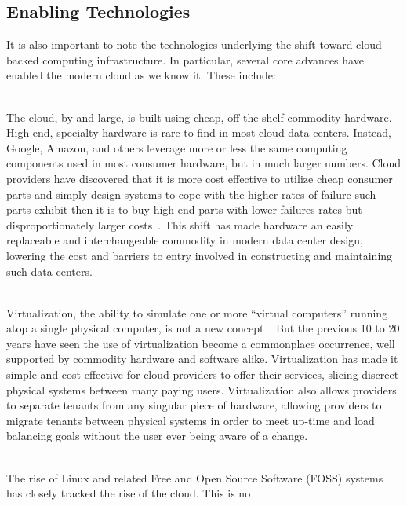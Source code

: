 \subsection{Enabling Technologies}

It is also important to note the technologies underlying the shift
toward cloud-backed computing infrastructure. In particular, several
core advances have enabled the modern cloud as we know it. These
include:

\begin{packed_desc}
\item[Commoditization of Hardware] \hfill \\ The cloud, by and large,
  is built using cheap, off-the-shelf commodity hardware. High-end,
  specialty hardware is rare to find in most cloud data
  centers. Instead, Google, Amazon, and others leverage more or less
  the same computing components used in most consumer hardware, but in
  much larger numbers. Cloud providers have discovered that it is more
  cost effective to utilize cheap consumer parts and simply design
  systems to cope with the higher rates of failure such parts exhibit
  then it is to buy high-end parts with lower failures rates but
  disproportionately larger costs~\cite{atwood2007}. This shift has
  made hardware an easily replaceable and interchangeable commodity in
  modern data center design, lowering the cost and barriers to entry
  involved in constructing and maintaining such data centers.
\item[Virtualization] \hfill \\ Virtualization, the ability to
  simulate one or more ``virtual computers'' running atop a single
  physical computer, is not a new concept~\cite{goldberg1974}. But the
  previous 10 to 20 years have seen the use of virtualization become a
  commonplace occurrence, well supported by commodity hardware and
  software alike. Virtualization has made it simple and cost effective
  for cloud-providers to offer their services, slicing discreet
  physical systems between many paying users. Virtualization also
  allows providers to separate tenants from any singular piece of
  hardware, allowing providers to migrate tenants between physical
  systems in order to meet up-time and load balancing goals without
  the user ever being aware of a change.
\item[Free and Open Source Software (and Hardware)] \hfill \\ The rise
  of Linux and related Free and Open Source Software (FOSS) systems
  has closely tracked the rise of the cloud. This is no

\end{packed_desc}
